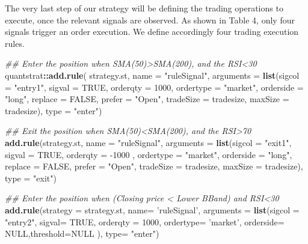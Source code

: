 \documentclass[
  11pt,
]{article}
\newenvironment{Shaded}{\begin{snugshade}}{\end{snugshade}}
\newcommand{\CommentTok}[1]{\textcolor[rgb]{0.56,0.35,0.01}{\textit{#1}}}
\newcommand{\DataTypeTok}[1]{\textcolor[rgb]{0.13,0.29,0.53}{#1}}
\newcommand{\DecValTok}[1]{\textcolor[rgb]{0.00,0.00,0.81}{#1}}
\newcommand{\KeywordTok}[1]{\textcolor[rgb]{0.13,0.29,0.53}{\textbf{#1}}}
\newcommand{\NormalTok}[1]{#1}
\newcommand{\OperatorTok}[1]{\textcolor[rgb]{0.81,0.36,0.00}{\textbf{#1}}}
\newcommand{\OtherTok}[1]{\textcolor[rgb]{0.56,0.35,0.01}{#1}}
\newcommand{\StringTok}[1]{\textcolor[rgb]{0.31,0.60,0.02}{#1}}
\begin{document}
The very last step of our strategy will be defining the trading
operations to execute, once the relevant signals are observed. As shown
in Table 4, only four signals trigger an order execution. We define
accordingly four trading execution rules.

\begin{Shaded}
\begin{Highlighting}[]
\CommentTok{## Enter the position when SMA(50)>SMA(200), and the RSI<30}
\NormalTok{quantstrat}\OperatorTok{::}\KeywordTok{add.rule}\NormalTok{(}
\NormalTok{  strategy.st, }\DataTypeTok{name =} \StringTok{"ruleSignal"}\NormalTok{,}
         \DataTypeTok{arguments =} \KeywordTok{list}\NormalTok{(}\DataTypeTok{sigcol =} \StringTok{"entry1"}\NormalTok{, }\DataTypeTok{sigval =} \OtherTok{TRUE}\NormalTok{,}
                          \DataTypeTok{orderqty =} \DecValTok{1000}\NormalTok{, }\DataTypeTok{ordertype =} \StringTok{"market"}\NormalTok{,}
                          \DataTypeTok{orderside =} \StringTok{"long"}\NormalTok{, }\DataTypeTok{replace =} \OtherTok{FALSE}\NormalTok{,}
                          \DataTypeTok{prefer =} \StringTok{"Open"}\NormalTok{, }
                          \DataTypeTok{tradeSize =}\NormalTok{ tradesize, }\DataTypeTok{maxSize =}\NormalTok{ tradesize),}
         \DataTypeTok{type =} \StringTok{"enter"}\NormalTok{)  }


\CommentTok{## Exit the position when SMA(50)<SMA(200), and the RSI>70}
\KeywordTok{add.rule}\NormalTok{(strategy.st, }\DataTypeTok{name =} \StringTok{"ruleSignal"}\NormalTok{,}
         \DataTypeTok{arguments =} \KeywordTok{list}\NormalTok{(}\DataTypeTok{sigcol =} \StringTok{"exit1"}\NormalTok{, }\DataTypeTok{sigval =} \OtherTok{TRUE}\NormalTok{,}
                          \DataTypeTok{orderqty =} \DecValTok{-1000}\NormalTok{ , }\DataTypeTok{ordertype =} \StringTok{"market"}\NormalTok{,}
                          \DataTypeTok{orderside =} \StringTok{"long"}\NormalTok{, }\DataTypeTok{replace =} \OtherTok{FALSE}\NormalTok{,}
                          \DataTypeTok{prefer =} \StringTok{"Open"}\NormalTok{, }
                          \DataTypeTok{tradeSize =}\NormalTok{ tradesize, }
                          \DataTypeTok{maxSize =}\NormalTok{ tradesize),}
         \DataTypeTok{type =} \StringTok{"exit"}\NormalTok{) }


\CommentTok{## Enter the position when (Closing price < Lower BBand) and RSI<30}
\KeywordTok{add.rule}\NormalTok{(}\DataTypeTok{strategy =}\NormalTok{ strategy.st, }\DataTypeTok{name=} \StringTok{'ruleSignal'}\NormalTok{,}
         \DataTypeTok{arguments =} \KeywordTok{list}\NormalTok{(}\DataTypeTok{sigcol =} \StringTok{"entry2"}\NormalTok{, }\DataTypeTok{sigval=} \OtherTok{TRUE}\NormalTok{,}
                          \DataTypeTok{orderqty =} \DecValTok{1000}\NormalTok{, }\DataTypeTok{ordertype=} \StringTok{'market'}\NormalTok{, }
                          \DataTypeTok{orderside=} \OtherTok{NULL}\NormalTok{,}\DataTypeTok{threshold=}\OtherTok{NULL}\NormalTok{ ), }
         \DataTypeTok{type=} \StringTok{"enter"}\NormalTok{)}



\end{Highlighting}
\end{Shaded}
\end{document}
